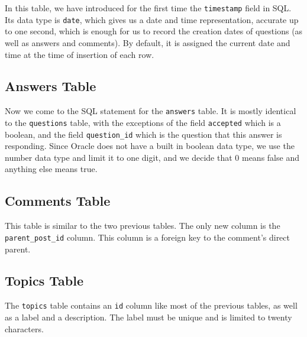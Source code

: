 In this table, we have introduced for the first time the \verb`timestamp` field in SQL. Its data type is \verb`date`, which gives us a date and time representation, accurate up to one second, which is enough for us to record the creation dates of questions (as well as answers and comments). By default, it is assigned the current date and time at the time of insertion of each row.


\subsection{Answers Table}

Now we come to the SQL statement for the \verb`answers` table. It is mostly identical to the \verb`questions` table, with the exceptions of the field \verb`accepted` which is a boolean, and the field \verb`question_id` which is the question that this answer is responding. Since Oracle does not have a built in boolean data type, we use the number data type and limit it to one digit, and we decide that 0 means false and anything else means true.


\subsection{Comments Table}

This table is similar to the two previous tables. The only new column is the \verb`parent_post_id` column. This column is a foreign key to the comment's direct parent.


\subsection{Topics Table}

The \verb`topics` table contains an \verb`id` column like most of the previous tables, as well as a label and a description. The label must be unique and is limited to twenty characters.


